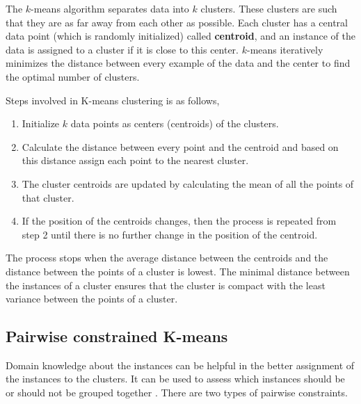 
The $k$-means algorithm separates data into $k$ clusters.  These clusters are such that they are as far away from each other as possible. Each cluster has a central data point (which is randomly initialized) called \textbf{centroid}, and an instance of the data is assigned to a cluster if it is close to this center.  $k$-means iteratively minimizes the distance between every example of the data and the center to find the optimal number of clusters.

Steps involved in K-means clustering is as follows,

\begin{enumerate}
    \item Initialize $k$ data points as centers (centroids) of the clusters.
    \item Calculate the distance between every point and the centroid and based on this distance assign each point to the nearest cluster.
    \item The cluster centroids are updated by calculating the mean of all the points of that cluster.
    \item If the position of the centroids changes, then the process is repeated from step 2 until there is no further change in the position of the centroid.
\end{enumerate}

The process stops when the average distance between the centroids and the distance between the points of a cluster is lowest. The minimal distance between the instances of a cluster ensures that the cluster is compact with the least variance between the points of a cluster.



\subsection{Pairwise constrained K-means } \label{constrainedKMeans}

Domain knowledge about the instances can be helpful in the better assignment of the instances to the clusters. It can be used to assess which instances should be or should not be grouped together \cite{wagstaff2001constrained}. There are two types of pairwise constraints.

